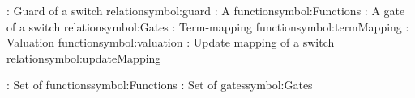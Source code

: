 \begin{tabbing}
\addsymbol \guard: {Guard of a switch relation}{symbol:guard}
\addsymbol \function: {A function}{symbol:Functions}
\addsymbol \gate: {A gate of a switch relation}{symbol:Gates}
\addsymbol \termMapping: {Term-mapping function}{symbol:termMapping}
\addsymbol \valuation: {Valuation function}{symbol:valuation}
\addsymbol \updateMapping: {Update mapping of a switch relation}{symbol:updateMapping}

\addsymbol \Functions: {Set of functions}{symbol:Functions}
\addsymbol \Gates: {Set of gates}{symbol:Gates}

\end{tabbing}
